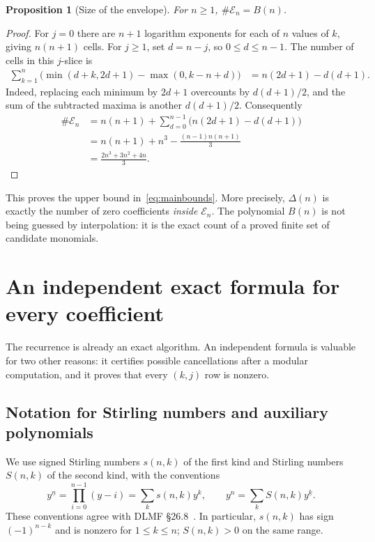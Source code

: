 \documentclass[11pt]{article}
\numberwithin{equation}{section}
\newtheorem{proposition}[theorem]{Proposition}
\theoremstyle{definition}
\theoremstyle{remark}
\newcommand{\fall}[2]{#1^{\underline{#2}}}
\begin{document}
\begin{proposition}[Size of the envelope]\label{prop:envelopesize}
For $n\ge1$, $\#\mathcal E_n=B(n)$.
\end{proposition}
\begin{proof}
For $j=0$ there are $n+1$ logarithm exponents for each of $n$ values of $k$,
giving $n(n+1)$ cells. For $j\ge1$, set $d=n-j$, so $0\le d\le n-1$.
The number of cells in this $j$-slice is
\begin{align*}
 \sum_{k=1}^n\bigl(\min(d+k,2d+1)-\max(0,k-n+d)\bigr)
 &=n(2d+1)-d(d+1).
\end{align*}
Indeed, replacing each minimum by $2d+1$ overcounts by
$d(d+1)/2$, and the sum of the subtracted maxima is another $d(d+1)/2$.
Consequently
\begin{align*}
 \#\mathcal E_n
 &=n(n+1)+\sum_{d=0}^{n-1}\bigl(n(2d+1)-d(d+1)\bigr)\\
 &=n(n+1)+n^3-\frac{(n-1)n(n+1)}3\\
 &=\frac{2n^3+3n^2+4n}{3}.
\end{align*}
\end{proof}

This proves the upper bound in~\eqref{eq:mainbounds}. More precisely,
$\Delta(n)$ is exactly the number of zero coefficients \emph{inside}
$\mathcal E_n$. The polynomial $B(n)$ is not being guessed by interpolation:
it is the exact count of a proved finite set of candidate monomials.

\section{An independent exact formula for every coefficient}

The recurrence is already an exact algorithm. An independent formula is
valuable for two other reasons: it certifies possible cancellations after a
modular computation, and it proves that every $(k,j)$ row is nonzero.

\subsection{Notation for Stirling numbers and auxiliary polynomials}

We use signed Stirling numbers $s(n,k)$ of the first kind and Stirling
numbers $S(n,k)$ of the second kind, with the conventions
\[
 \fall{y}{n}=\prod_{i=0}^{n-1}(y-i)=\sum_k s(n,k)y^k,
 \qquad y^n=\sum_k S(n,k)\fall{y}{k}.
\]
These conventions agree with DLMF \S26.8~\cite{dlmf}. In particular,
$s(n,k)$ has sign $(-1)^{n-k}$ and is nonzero for $1\le k\le n$;
$S(n,k)>0$ on the same range.
\end{document}
